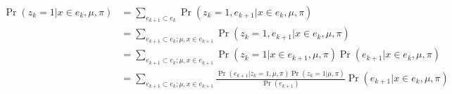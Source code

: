 \begin{align}
    \Pr(z_k = 1 | x \in e_k, \mu, \pi) 
    &= \sum_{e_{k+1} \subset e_k} \Pr(z_k = 1, e_{k+1} | x \in e_k, \mu, \pi) \\
    &= \sum_{e_{k+1} \subset e_k; \mu, x \in e_{k+1}}  \Pr(z_k = 1, e_{k+1} | x \in e_k, \mu, \pi) \\
    &= \sum_{e_{k+1} \subset e_k; \mu, x \in e_{k+1}}  \Pr(z_k = 1 | x \in e_{k+1}, \mu, \pi) \Pr(e_{k+1} | x \in e_k, \mu, \pi) \\
    &= \sum_{e_{k+1} \subset e_k; \mu, x \in e_{k+1}}  \frac{\Pr(e_{k + 1} | z_k = 1, \mu, \pi) \Pr(z_k = 1 | \mu, \pi)  }{\Pr(e_{k + 1})} \Pr(e_{k+1} | x \in e_k, \mu, \pi)
\end{align}
